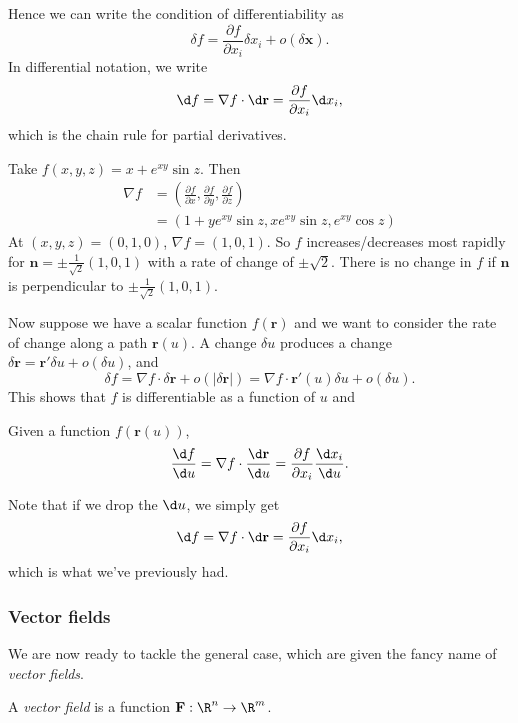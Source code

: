 \documentclass[a4paper]{article}
\begin{document}
Hence we can write the condition of differentiability as
\[
  \delta f = \frac{\partial f}{\partial x_i}\delta x_i + o(\delta \mathbf{x}).
\]
In differential notation, we write
\[
  \d f = \nabla f\cdot \d \mathbf{r} = \frac{\partial f}{\partial x_i}\d x_i,
\]
which is the chain rule for partial derivatives.

\begin{eg}
  Take $f(x, y, z) = x + e^{xy}\sin z$. Then
  \begin{align*}
    \nabla f &= \left(\frac{\partial f}{\partial x}, \frac{\partial f}{\partial y}, \frac{\partial f}{\partial z}\right)\\
    &= (1 + ye^{xy}\sin z, xe^{xy}\sin z, e^{xy}\cos z)
  \end{align*}
  At $(x, y, z) = (0, 1, 0)$, $\nabla f = (1, 0, 1)$. So $f$ increases/decreases most rapidly for $\mathbf{n} = \pm \frac{1}{\sqrt{2}}(1, 0, 1)$ with a rate of change of $\pm \sqrt{2}$. There is no change in $f$ if $\mathbf{n}$ is perpendicular to $\pm \frac{1}{\sqrt{2}}(1, 0, 1)$.
\end{eg}

Now suppose we have a scalar function $f(\mathbf{r})$ and we want to consider the rate of change along a path $\mathbf{r}(u)$. A change $\delta u$ produces a change $\delta \mathbf{r} = \mathbf{r}' \delta u + o(\delta u)$, and
\[
  \delta f = \nabla f\cdot \delta \mathbf{r} + o(|\delta \mathbf{r}|) = \nabla f\cdot \mathbf{r}'(u)\delta u + o(\delta u).
\]
This shows that $f$ is differentiable as a function of $u$ and
\begin{thm}
  Given a function $f(\mathbf{r}(u))$,
  \[
    \frac{\d f}{\d u} = \nabla f\cdot \frac{\d \mathbf{r}}{\d u} = \frac{\partial f}{\partial x_i} \frac{\d x_i}{\d u}.
  \]
\end{thm}
Note that if we drop the $\d u$, we simply get
\[
  \d f = \nabla f\cdot \d \mathbf{r} = \frac{\partial f}{\partial x_i}\d x_i,
\]
which is what we've previously had.
\subsubsection*{Vector fields }
We are now ready to tackle the general case, which are given the fancy name of \emph{vector fields}.
\begin{defi}
  A \emph{vector field} is a function $\mathbf{F}: \R^n\to \R^m$.
\end{defi}
\end{document}
